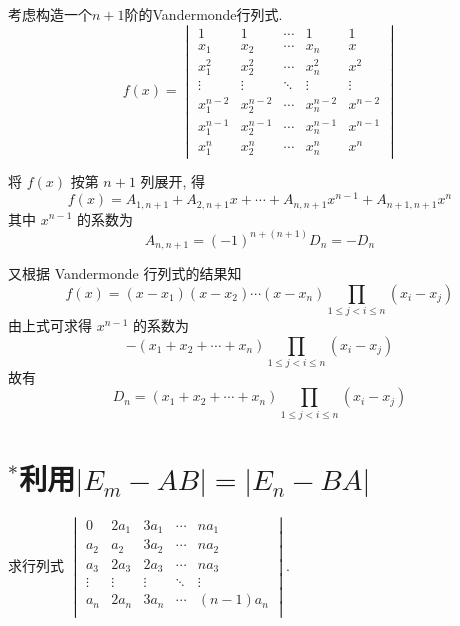 \begin{solution}
    考虑构造一个$n+1$阶的Vandermonde行列式.
    \[ f(x)=\begin{vmatrix}
        1 & 1 & \cdots & 1 & 1 \\
        x_1 & x_2 & \cdots & x_n & x \\
        x_1^{2} & x_2^{2} & \cdots & x_n^{2} & x^{2} \\
        \vdots & \vdots & \ddots & \vdots & \vdots \\
        x_1^{n-2} & x_2^{n-2} & \cdots & x_n^{n-2} & x^{n-2} \\
        x_1^{n-1} & x_2^{n-1} & \cdots & x_n^{n-1} & x^{n-1} \\
        x_1^{n} & x_2^{n} & \cdots & x_n^{n} & x^{n}
    \end{vmatrix} \]

    将 $f(x)$ 按第 $n+1$ 列展开, 得
    \[ f(x)=A_{1, n+1}+A_{2, n+1} x+\cdots+A_{n, n+1} x^{n-1}+A_{n+1, n+1} x^{n} \]
    其中 $x^{n-1}$ 的系数为
    \[ A_{n, n+1}=(-1)^{n+(n+1)} D_n=-D_n \]

    又根据 Vandermonde 行列式的结果知
    \[ f(x)=(x-x_1)(x-x_2)\cdots(x-x_n) \prod_{1 \leq j<i \leq n}(x_i-x_j) \]
    由上式可求得 $x^{n-1}$ 的系数为
    \[ -(x_1+x_2+\cdots+x_n) \prod_{1 \leq j<i \leq n}(x_i-x_j) \]
    故有
    \[ D_n=(x_1+x_2+\cdots+x_n) \prod_{1 \leq j<i \leq n}(x_i-x_j) \]
\end{solution}

\section{$^*$利用$|E_m-AB|=|E_n-BA|$} \label{sec:17:利用}

\begin{example}
    求行列式 $\begin{vmatrix}
        0&2a_1&3a_1&\cdots&na_1\\
        a_2&a_2&3a_2&\cdots&na_2\\
        a_3&2a_3&2a_3&\cdots&na_3\\
        \vdots&\vdots&\vdots&\ddots&\vdots\\
        a_n&2a_n&3a_n&\cdots&(n-1)a_n\\
    \end{vmatrix}$.
\end{example}

